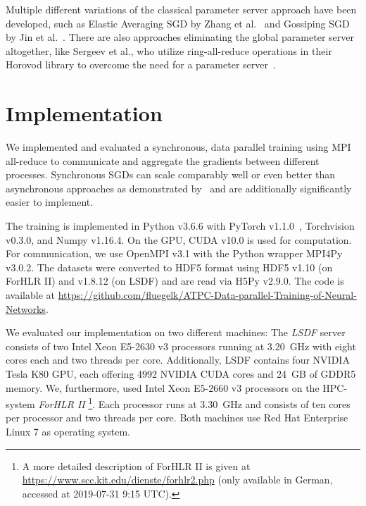 \documentclass[conference]{IEEEtran}
\begin{document}
Multiple different variations of the classical parameter server approach have been developed, such as Elastic Averaging SGD by Zhang et al.~\cite{zhang2015-Elastic-AvgSGD} and Gossiping SGD by Jin et al.~\cite{jin2016-How-to-scale}.
There are also approaches eliminating the global parameter server altogether, like Sergeev et al., who utilize ring-all-reduce operations in their Horovod library to overcome the need for a parameter server~\cite{sergeev2018horovod}.






\section{Implementation} %
\label{sec:implementation}
We implemented and evaluated a synchronous, data parallel training using MPI all-reduce to communicate and aggregate the gradients between different processes.
Synchronous SGDs can scale comparably well or even better than asynchronous approaches as demonstrated by~\cite{jin2016-How-to-scale,chen2016-Revisiting-distributed-synchronous-SGD} and are additionally significantly easier to implement.

The training is implemented in Python v3.6.6 with PyTorch v1.1.0~\cite{paszke2017automatic}, Torchvision v0.3.0, and Numpy v1.16.4.
On the GPU, CUDA v10.0 is used for computation.
For communication, we use OpenMPI v3.1 with the Python wrapper MPI4Py v3.0.2.
The datasets were converted to HDF5 format using HDF5 v1.10 (on ForHLR II) and v1.8.12 (on LSDF) and are read via H5Py v2.9.0.
The code is available at \url{https://github.com/fluegelk/ATPC-Data-parallel-Training-of-Neural-Networks}.

We evaluated our implementation on two different machines:
The \emph{LSDF} server consists of two Intel Xeon E5-2630 v3 processors running at 3.20~GHz with eight cores each and two threads per core.
Additionally, LSDF contains four NVIDIA Tesla K80 GPU, each offering 4992 NVIDIA CUDA cores and 24~GB of GDDR5 memory.
%
We, furthermore, used Intel Xeon E5-2660 v3 processors on the HPC-system \emph{ForHLR II}
\footnote{A more detailed description of ForHLR II is given at \url{https://www.scc.kit.edu/dienste/forhlr2.php} (only available in German, accessed at 2019-07-31 9:15 UTC).}.
Each processor runs at 3.30~GHz and consists of ten cores per processor and two threads per core.
%
Both machines use Red Hat Enterprise Linux 7 as operating system.
\end{document}
